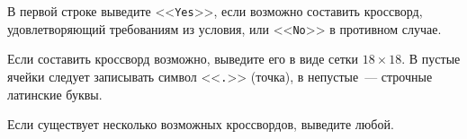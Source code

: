 В первой строке выведите <<\texttt{Yes}>>, если возможно составить кроссворд, удовлетворяющий требованиям из условия, или <<\texttt{No}>> в противном случае.

Если составить кроссворд возможно, выведите его в виде сетки $18 \times 18$. В пустые ячейки следует записывать символ <<\texttt{.}>> (точка), в непустые~--- строчные латинские буквы.

Если существует несколько возможных кроссвордов, выведите любой.